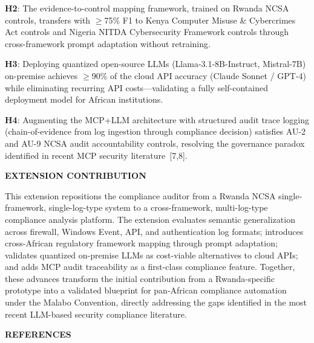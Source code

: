 \documentclass[12pt]{article}
\begin{document}
\textbf{H2}: The evidence-to-control mapping framework, trained on Rwanda NCSA controls, transfers with $\geq$75\% F1 to Kenya Computer Misuse \& Cybercrimes Act controls and Nigeria NITDA Cybersecurity Framework controls through cross-framework prompt adaptation without retraining.

\textbf{H3}: Deploying quantized open-source LLMs (Llama-3.1-8B-Instruct, Mistral-7B) on-premise achieves $\geq$90\% of the cloud API accuracy (Claude Sonnet / GPT-4) while eliminating recurring API costs---validating a fully self-contained deployment model for African institutions.

\textbf{H4}: Augmenting the MCP+LLM architecture with structured audit trace logging (chain-of-evidence from log ingestion through compliance decision) satisfies AU-2 and AU-9 NCSA audit accountability controls, resolving the governance paradox identified in recent MCP security literature~[7,8].

\bigskip

\textbf{EXTENSION CONTRIBUTION}

This extension repositions the compliance auditor from a Rwanda NCSA single-framework, single-log-type system to a cross-framework, multi-log-type compliance analysis platform. The extension evaluates semantic generalization across firewall, Windows Event, API, and authentication log formats; introduces cross-African regulatory framework mapping through prompt adaptation; validates quantized on-premise LLMs as cost-viable alternatives to cloud APIs; and adds MCP audit traceability as a first-class compliance feature. Together, these advances transform the initial contribution from a Rwanda-specific prototype into a validated blueprint for pan-African compliance automation under the Malabo Convention, directly addressing the gaps identified in the most recent LLM-based security compliance literature.

\bigskip

\textbf{REFERENCES}
\end{document}
